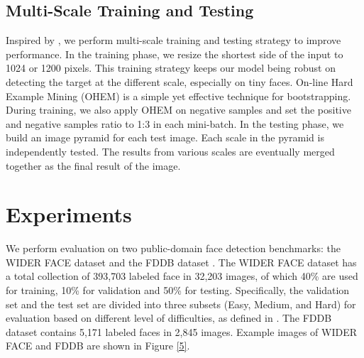 \documentclass{article} %
\begin{document}
\subsection{Multi-Scale Training and Testing}	

Inspired by \cite{facercnn}, we perform multi-scale training and testing strategy to improve performance. In the training phase, we resize the shortest side of the input to 1024 or 1200 pixels. This training strategy keeps our model being robust on detecting the target at the different scale, especially on tiny faces. 
On-line Hard Example Mining (OHEM) \cite{OHEM} is a simple yet effective technique for bootstrapping. During training, we also apply OHEM on negative samples and set the positive and negative samples ratio to 1:3 in each mini-batch.
In the testing phase, we build an image pyramid for each test image. Each scale in the pyramid is independently tested. The results from various scales are eventually merged together as the final result of the image. 



\section{Experiments}


We perform evaluation on two public-domain face detection benchmarks: the WIDER FACE dataset \cite{wider} and the FDDB dataset \cite{fddb}. 
The WIDER FACE dataset has a total collection of 393,703 labeled face in 32,203 images, of which 40\% are used for training, 10\% for validation and 50\% for testing. Specifically, the validation set and the test set are divided into three subsets (Easy, Medium, and Hard) for evaluation based on different level of difficulties, as defined in \cite{wider}. 
The FDDB dataset contains 5,171 labeled faces in 2,845 images. 
Example images of WIDER FACE and FDDB are shown in Figure \ref{5}.
\end{document}
